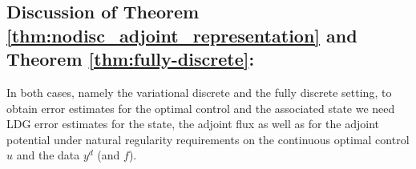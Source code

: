 \documentclass[a4paper,10pt]{article}
\newcommand{\hF}{{\frac{1}{2}}}
\newcommand{\bp}{{\mathbf{p}}}
\numberwithin{theorem}{section}
\begin{document}

\subsection{Discussion of Theorem \ref{thm:nodisc_adjoint_representation} and Theorem \ref{thm:fully-discrete}:}\label{discussion} In both cases, namely the variational discrete and the fully discrete setting, to obtain error estimates for the optimal control and the associated state we need LDG error estimates for the state, the adjoint flux as well as for the adjoint potential under natural regularity requirements on the continuous optimal control $u$ and the data $y^d$ (and $f$).
\end{document}
